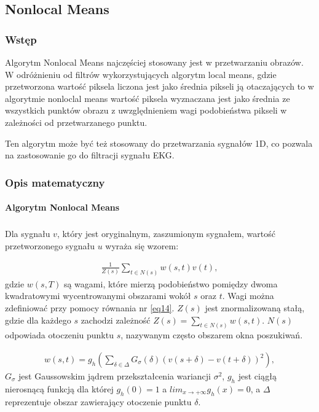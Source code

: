 \documentclass[a4paper]{article}
\begin{document}


\subsection{Nonlocal Means}
\subsubsection{Wstęp}

Algorytm Nonlocal Means najczęściej stosowany jest w przetwarzaniu obrazów. W odróżnieniu od filtrów wykorzystujących algorytm local means, gdzie przetworzona wartość piksela liczona jest jako średnia pikseli ją otaczających to w algorytmie nonloclal means wartość piksela wyznaczana jest jako średnia ze wszystkich punktów obrazu z uwzględnieniem wagi podobieństwa pikseli w zależności od przetwarzanego punktu. 

Ten algorytm może być też stosowany do przetwarzania sygnałów 1D, co pozwala na zastosowanie go do filtracji sygnału EKG.
\subsubsection{Opis matematyczny}

\paragraph{Algorytm Nonlocal Means}
\subparagraph{}

Dla sygnału $v$, który jest oryginalnym, zaszumionym sygnałem, wartość przetworzonego sygnału $u$ wyraża się wzorem:

\begin{equation}\label{eq13}
\begin{split}
\frac{1}{Z(s)}\displaystyle\sum_{t\in{N(s)}}w(s,t)v(t),
\end{split}
\end{equation}
gdzie $w(s,T)$ są wagami, które mierzą podobieństwo pomiędzy dwoma kwadratowymi wycentrowanymi obszarami wokół $s$ oraz $t$. Wagi można zdefiniować przy pomocy równania nr \ref{eq14}.  $Z(s)$ jest znormalizowaną stałą, gdzie dla każdego $s$ zachodzi zależność $Z(s) = \sum_{t\in{N(s)}}w(s,t)$. $N(s)$ odpowiada otoczeniu punktu $s$, nazywanym często obszarem okna poszukiwań. 

\begin{equation}\label{eq14}
\begin{split}
w(s,t) = g_{h}(\displaystyle\sum_{\delta\in{\Delta}}G_{\sigma}(\delta)(v(s+\delta) - v(t+\delta))^2),
\end{split}
\end{equation}
$G_{\sigma}$ jest Gaussowskim jądrem przekształcenia wariancji $\sigma^2$, $g_{h}$ jest ciągłą nierosnącą funkcją dla której $g_{h}(0) = 1$ a $lim_{x\to+\infty}g_{h}(x) = 0$, a $\Delta$ reprezentuje obszar zawierający otoczenie punktu $\delta$.
\end{document}
